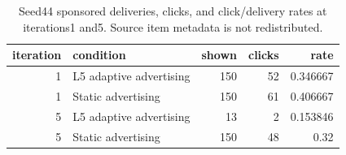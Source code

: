 \begin{table}[htbp!]
\centering
\small
\setlength{\tabcolsep}{3pt}
\renewcommand{\arraystretch}{1.1}
\begin{tabular}{rlrrr}
\hline
iteration & condition & shown & clicks & rate \\
\hline
1 & L5 adaptive advertising & 150 & 52 & 0.346667 \\
1 & Static advertising & 150 & 61 & 0.406667 \\
5 & L5 adaptive advertising & 13 & 2 & 0.153846 \\
5 & Static advertising & 150 & 48 & 0.32 \\
\hline
\end{tabular}
\caption{Seed44 sponsored deliveries, clicks, and click/delivery rates at iterations1 and5. Source item metadata is not redistributed.}
\label{chap:results:tab:rq1_seed44_advertising_spike_counts}
\end{table}
